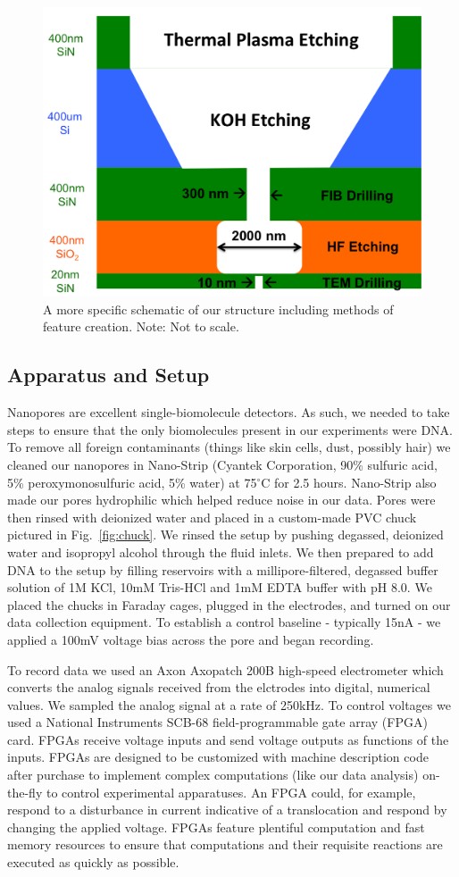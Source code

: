 \documentclass[aps,prl,preprint,groupedaddress]{revtex4}
\begin{document}
\begin{figure}
\centering
\includegraphics[width=.45\textwidth]{figures/structure-schematic}
\caption{A more specific schematic of our structure including methods of feature creation. Note: Not to scale.}
\label{fig:structure-schematic}
\end{figure}

\subsection{Apparatus and Setup}

Nanopores are excellent single-biomolecule detectors.
As such, we needed to take steps to ensure that the only biomolecules present in our experiments were DNA.
To remove all foreign contaminants (things like skin cells, dust, possibly hair) we cleaned our nanopores in Nano-Strip (Cyantek  Corporation, 90\% sulfuric acid, 5\% peroxymonosulfuric acid, 5\% water) at 75$^\circ$C for 2.5 hours.
Nano-Strip also made our pores hydrophilic which helped reduce noise in our data.
Pores were then rinsed with deionized water and placed in a custom-made PVC chuck pictured in Fig.~\ref{fig:chuck}.
We rinsed the setup by pushing degassed, deionized water and isopropyl alcohol through the fluid inlets.
We then prepared to add DNA to the setup by filling reservoirs with a millipore-filtered, degassed buffer solution of 1M KCl, 10mM Tris-HCl and 1mM EDTA buffer with pH 8.0.
We placed the chucks in Faraday cages, plugged in the electrodes, and turned on our data collection equipment.
To establish a control baseline - typically 15nA - we applied a 100mV voltage bias across the pore and began recording.

To record data we used an Axon Axopatch 200B high-speed electrometer which converts the analog signals received from the elctrodes into digital, numerical values.
We sampled the analog signal at a rate of 250kHz.
To control voltages we used a National Instruments SCB-68 field-programmable gate array (FPGA) card.
FPGAs receive voltage inputs and send voltage outputs as functions of the inputs.
FPGAs are designed to be customized with machine description code after purchase to implement complex computations (like our data analysis) on-the-fly to control experimental apparatuses.
An FPGA could, for example, respond to a disturbance in current indicative of a translocation and respond by changing the applied voltage.
FPGAs feature plentiful computation and fast memory resources to ensure that computations and their requisite reactions are executed as quickly as possible.
\end{document}
